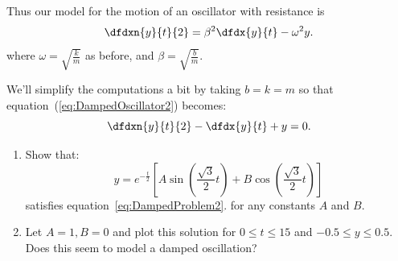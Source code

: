 Thus our model for the motion of  an oscillator with resistance is
\begin{equation}
  \dfdxn{y}{t}{2}=\beta^2\dfdx{y}{t}-\omega^2y.\label{eq:DampedOscillator2}
\end{equation}
where $\omega=\sqrt{\frac{k}{m}}$ as before, and
$\beta=\sqrt{\frac{b}{m}}$.


\begin{embeddedproblem}{}
  \label{problem:DampedOscillation2}
  We'll simplify the computations a bit by taking $b=k=m$ so
  that equation~(\ref{eq:DampedOscillator2}) becomes:
  \begin{equation}
    \dfdxn{y}{t}{2}-\dfdx{y}{t}+y=0.\label{eq:DampedProblem2}
  \end{equation}
  \begin{enumerate}[label={\bf{}(\alph*)}]{}
  \item Show that:
    \begin{equation}
      \displaystyle y=e^{-\frac{t}{2}}
      \left[
        A\sin\left(\frac{\sqrt{3}}{2}t\right)+B\cos\left(\frac{\sqrt{3}}{2}t\right)
      \right]
      \label{eq:DampedHarmOsc2}
    \end{equation}satisfies  equation~\ref{eq:DampedProblem2}.
    for any constants $A$ and $B$.
  \item Let $A=1, B=0$ and plot this solution for $0\le t\le 15$
    and $-0.5\le y \le 0.5.$ Does this seem to model a damped
    oscillation?
  \end{enumerate}
\end{embeddedproblem}



